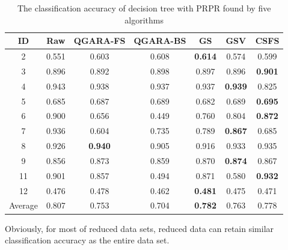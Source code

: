 \documentclass[review]{elsarticle}
\begin{document}
		\begin{table}[htb]
			\centering
			\caption{The classification accuracy of decision tree with PRPR found by five algorithms}
			\begin{tabular}{ccccccc}
				\hline%
				ID    & Raw   & QGARA-FS & QGARA-BS & GS    & GSV   & CSFS \\
				\hline%
				2     & 0.551 & 0.603 & 0.608 & \textbf{0.614} & 0.574 & 0.599 \\
				3     & 0.896 & 0.892 & 0.898 & 0.897 & 0.896 & \textbf{0.901} \\
				4     & 0.943 & 0.938 & 0.937 & 0.937 & \textbf{0.939} & 0.825 \\
				5     & 0.685 & 0.687 & 0.689 & 0.682 & 0.689 & \textbf{0.695} \\
				6     & 0.900 & 0.656 & 0.449 & 0.760 & 0.804 & \textbf{0.872} \\
				7     & 0.936 & 0.604 & 0.735 & 0.789 & \textbf{0.867} & 0.685 \\
				8     & 0.926 & \textbf{0.940} & 0.905 & 0.916 & 0.933 & 0.935 \\
				9     & 0.856 & 0.873 & 0.859 & 0.870 & \textbf{0.874} & 0.867 \\
				11    & 0.901 & 0.857 & 0.494 & 0.871 & 0.580 & \textbf{0.932} \\
				12    & 0.476 & 0.478 & 0.462 & \textbf{0.481} & 0.475 & 0.471 \\
				\hline%
				Average & 0.807 & 0.753 & 0.704 & \textbf{0.782} & 0.763 & 0.778 \\
				\hline%
			\end{tabular}%
			\label{cadtp}%
		\end{table}%
		Obviously, for most of reduced data sets, reduced data can retain similar classification accuracy as the entire data set. 
\end{document}
